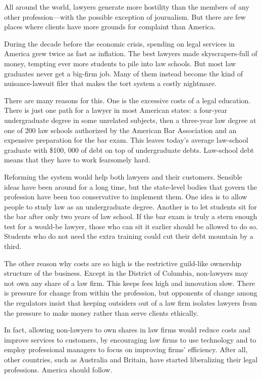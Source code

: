 All around the world, lawyers generate more hostility than the members
of any other profession---with the possible exception of journalism.
But there are few places where clients have more grounds for complaint
than America.

During the decade before the economic crisis, spending on legal services
in America grew twice as fast as inflation. The best lawyers made
skyscrapers-full of money, tempting ever more students to pile into law
schools. But most law graduates never get a big-firm job. Many of them
instead become the kind of nuisance-lawsuit filer that makes the tort
system a costly nightmare.

There are many reasons for this. One is the excessive costs of a legal
education. There is just one path for a lawyer in most American states:
a four-year undergraduate degree in some unrelated subjects, then a
three-year law degree at one of 200 law schools authorized by the
American Bar Association and an expensive preparation for the bar exam.
This leaves today's average law-school graduate with \$100, 000 of debt
on top of undergraduate debts. Law-school debt means that they have to
work fearsomely hard.

Reforming the system would help both lawyers and their customers.
Sensible ideas have been around for a long time, but the state-level
bodies that govern the profession have been too conservative to
implement them. One idea is to allow people to study law as an
undergraduate degree. Another is to let students sit for the bar after
only two years of law school. If the bar exam is truly a stern enough
test for a would-be lawyer, those who can sit it earlier should be
allowed to do so. Students who do not need the extra training could cut
their debt mountain by a third.

The other reason why costs are so high is the restrictive guild-like
ownership structure of the business. Except in the District of Columbia,
non-lawyers may not own any share of a law firm. This keeps fees high
and innovation slow. There is pressure for change from within the
profession, but opponents of change among the regulators insist that
keeping outsiders out of a law firm isolates lawyers from the pressure
to make money rather than serve clients ethically.

In fact, allowing non-lawyers to own shares in law firms would reduce
costs and improve services to customers, by encouraging law firms to use
technology and to employ professional managers to focus on improving
firms' efficiency. After all, other countries, such as Australia and
Britain, have started liberalizing their legal professions. America
should follow.


